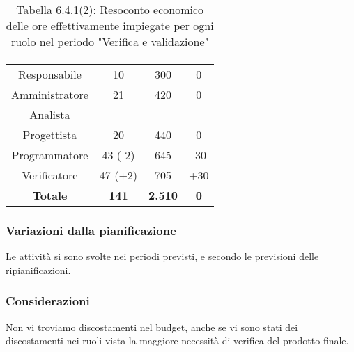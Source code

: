 \renewcommand{\arraystretch}{1.4}
\begin{table}[H]
\begin{center}
\begin{tabular}{|c|c|c|c|}
\hline
\rowcolor{title_row}
\textbf{\color{title_text}{Ruolo}}  & \textbf{\color{title_text}{Ore}} & \textbf{\color{title_text}{Costo in \euro}} & \textbf{\color{title_text}{Differenza al preventivo in \euro}} \\ \hline
Responsabile    & 10 & 300 & 0 \\ \hline
Amministratore  & 21 & 420 & 0\\ \hline
Analista        & & & \\ \hline
Progettista     & 20 & 440 & 0\\ \hline
Programmatore   & 43 (-2) & 645 & -30\\ \hline
Verificatore    & 47 (+2) & 705 & +30\\ \hline
\textbf{Totale} & \textbf{141}    & \textbf{2.510} & \textbf{0} \\ \hline
\end{tabular}
\caption{Tabella 6.4.1(2): Resoconto economico delle ore effettivamente impiegate per ogni ruolo nel periodo "Verifica e validazione"\label{}}
\end{center}
\end{table}
\renewcommand{\arraystretch}{1}


\subsubsection{Variazioni dalla pianificazione}
Le attività si sono svolte nei periodi previsti, e secondo le previsioni delle ripianificazioni.

\subsubsection{Considerazioni}
Non vi troviamo discostamenti nel budget, anche se vi sono stati dei discostamenti nei ruoli vista la maggiore necessità di verifica del prodotto finale.
\pagebreak
